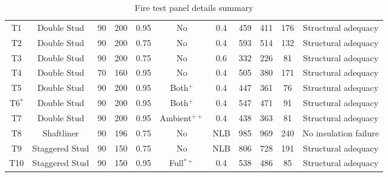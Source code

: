 \begin{sidewaystable}[!htbp]
	\begin{threeparttable}
		\begin{center}
			\caption{Fire test panel details summary}
				\begin{tabularx}{\textheight}{ccccccccccc}
					\toprule
					\multicolumn{1}{m{2.4em}}{\centering{Test Name}} & 
					\multicolumn{1}{m{5.6em}}{\centering{Description}} & 
					\multicolumn{1}{m{3 em}}{\centering{Stud Depth (mm)}} & 
					\multicolumn{1}{m{3 em}}{\centering{Cavity Depth (mm)}} & 
					\multicolumn{1}{m{5em}}{\centering{Stud Thickness (mm)}} & 
					\multicolumn{1}{m{4em}}{\centering{Cavity Insulation}} &
					\multicolumn{1}{m{3em}}{\centering{Load Ratio}} &
					\multicolumn{1}{m{3em}}{\centering{Critical HF \degree C}} &
					\multicolumn{1}{m{3em}}{\centering{Critical CF \degree C}} &
					\multicolumn{1}{m{3em}}{\centering{Failure Time}} &
					\multicolumn{1}{m{8em}}{\centering{Failure Criteria}} \\
					\midrule
					T1  & Double Stud & 90 & 200 & 0.95 & No & 0.4 & 459  & 411 & 176 & Structural adequacy \\
					T2  & Double Stud & 90 & 200 & 0.75 & No & 0.4 & 593  & 514 & 132 & Structural adequacy \\
					T3  & Double Stud & 90 & 200 & 0.75 & No & 0.6 & 332  & 226 & 81 & Structural adequacy \\
					T4  & Double Stud & 70 & 160 & 0.95 & No & 0.4 & 505 & 380 & 171 & Structural adequacy \\
					T5  & Double Stud & 90 & 200 & 0.95 & Both\(^+\) & 0.4 & 447 & 361 & 76 & Structural adequacy \\
					T6\(^*\)  & Double Stud & 90 & 200 & 0.95 & Both\(^+\) & 0.4 & 547 & 471 & 91 & Structural adequacy \\
					T7  & Double Stud & 90 & 200 & 0.95 & Ambient\(^{++}\) & 0.4 & 438 & 363 & 81 & Structural adequacy \\
					T8  & Shaftliner & 90 & 196 & 0.75 & No & NLB& 985 & 969 & 240 & No insulation failure \\
					T9  & Staggered Stud & 90 & 150 & 0.75 & No & NLB & 806 & 728 & 191 & Structural adequacy \\
					T10  & Staggered Stud & 90 & 150 & 0.95 & Full\(^{*+}\) & 0.4 & 538 & 486 & 85 & Structural adequacy \\
					\bottomrule
				\end{tabularx}%
				\label{tab:full-scale-summary}%
					\begin{tablenotes}

\end{tablenotes}
\end{center}
\end{threeparttable}
\end{sidewaystable}
